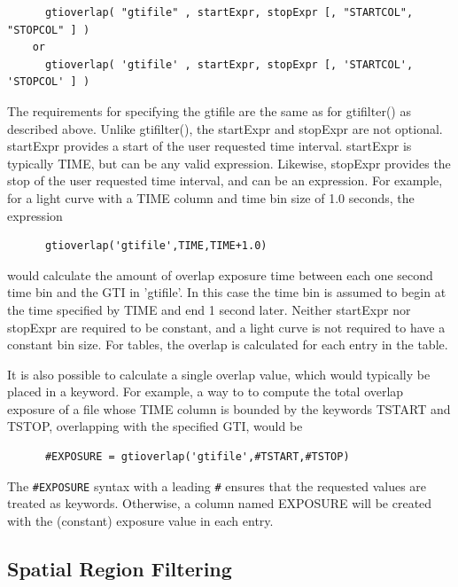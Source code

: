 \documentclass[11pt]{book}
\begin{document}
\begin{verbatim}
      gtioverlap( "gtifile" , startExpr, stopExpr [, "STARTCOL", "STOPCOL" ] )
    or
      gtioverlap( 'gtifile' , startExpr, stopExpr [, 'STARTCOL', 'STOPCOL' ] )
\end{verbatim}

    The requirements for specifying the gtifile are the same as for
    gtifilter() as described above.  Unlike gtifilter(), the startExpr
    and stopExpr are not optional.  startExpr provides a start of the
    user requested time interval.  startExpr is typically TIME, but
    can be any valid expression.  Likewise, stopExpr provides the stop
    of the user requested time interval, and can be an expression.
    For example, for a light curve with a TIME column and time bin
    size of 1.0 seconds, the expression

\begin{verbatim}
      gtioverlap('gtifile',TIME,TIME+1.0)
\end{verbatim}

    would calculate the amount of overlap exposure time between each
    one second time bin and the GTI in 'gtifile'.  In this case the
    time bin is assumed to begin at the time specified by TIME and end
    1 second later.  Neither startExpr nor stopExpr are required to be
    constant, and a light curve is not required to have a constant bin
    size.  For tables, the overlap is calculated for each entry in the
    table.

    It is also possible to calculate a single overlap value, which
    would typically be placed in a keyword.  For example, a way to to
    compute the total overlap exposure of a file whose TIME column is
    bounded by the keywords TSTART and TSTOP, overlapping with the
    specified GTI, would be

\begin{verbatim}
      #EXPOSURE = gtioverlap('gtifile',#TSTART,#TSTOP)
\end{verbatim}

    The \verb+#EXPOSURE+ syntax with a leading \verb+#+ ensures that the
    requested values are treated as keywords.  Otherwise, a column
    named EXPOSURE will be created with the (constant) exposure value
    in each entry.  



\subsection{Spatial Region Filtering}
\end{document}
